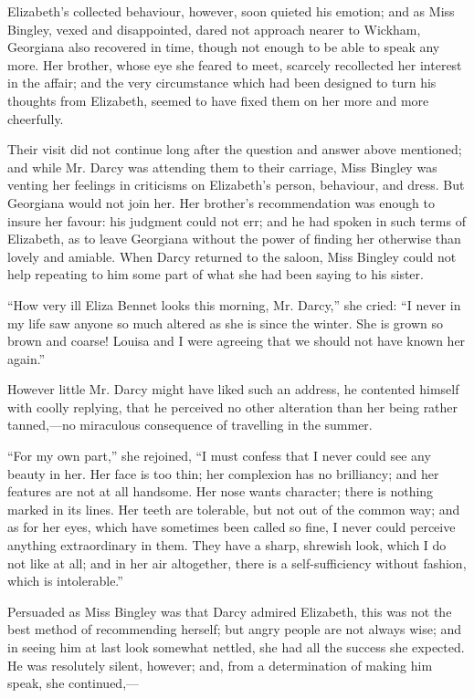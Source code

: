 Elizabeth's collected behaviour, however, soon quieted his emotion; and as Miss Bingley, vexed and disappointed, dared not approach nearer to Wickham, Georgiana also recovered in time, though not enough to be able to speak any more. Her brother, whose eye she feared to meet, scarcely recollected her interest in the affair; and the very circumstance which had been designed to turn his thoughts from Elizabeth, seemed to have fixed them on her more and more cheerfully.

Their visit did not continue long after the question and answer above mentioned; and while Mr. Darcy was attending them to their carriage, Miss Bingley was venting her feelings in criticisms on Elizabeth's person, behaviour, and dress. But Georgiana would not join her. Her brother's recommendation was enough to insure her favour: his judgment could not err; and he had spoken in such terms of Elizabeth, as to leave Georgiana without the power of finding her otherwise than lovely and amiable. When Darcy returned to the saloon, Miss Bingley could not help repeating to him some part of what she had been saying to his sister.

``How very ill Eliza Bennet looks this morning, Mr. Darcy,'' she cried: ``I never in my life saw anyone so much altered as she is since the winter. She is grown so brown and coarse! Louisa and I were agreeing that we should not have known her again.''

However little Mr. Darcy might have liked such an address, he contented himself with coolly replying, that he perceived no other alteration than her being rather tanned,---no miraculous consequence of travelling in the summer.

``For my own part,'' she rejoined, ``I must confess that I never could see any beauty in her. Her face is too thin; her complexion has no brilliancy; and her features are not at all handsome. Her nose wants character; there is nothing marked in its lines. Her teeth are tolerable, but not out of the common way; and as for her eyes, which have sometimes been called so fine, I never could perceive anything extraordinary in them. They have a sharp, shrewish look, which I do not like at all; and in her air altogether, there is a self-sufficiency without fashion, which is intolerable.''

Persuaded as Miss Bingley was that Darcy admired Elizabeth, this was not the best method of recommending herself; but angry people are not always wise; and in seeing him at last look somewhat nettled, she had all the success she expected. He was resolutely silent, however; and, from a determination of making him speak, she continued,---

